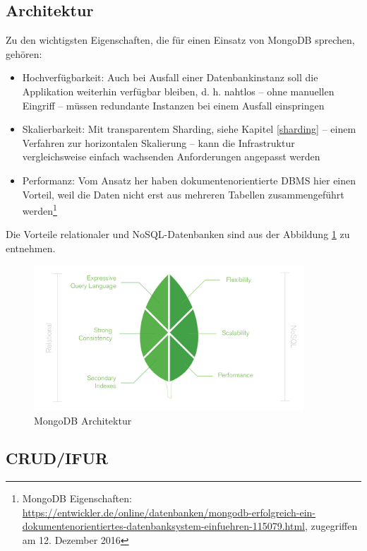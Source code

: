 \subsection{Architektur}
Zu den wichtigsten Eigenschaften, die für einen Einsatz von MongoDB sprechen, gehören:
\begin{itemize}
\item Hochverfügbarkeit: Auch bei Ausfall einer Datenbankinstanz soll die Applikation weiterhin verfügbar bleiben, d. h. nahtlos – ohne manuellen Eingriff – müssen redundante Instanzen bei einem Ausfall einspringen
\item Skalierbarkeit: Mit transparentem Sharding, siehe Kapitel \ref{sharding} – einem Verfahren zur horizontalen Skalierung – kann die Infrastruktur vergleichsweise einfach wachsenden Anforderungen angepasst werden
\item Performanz: Vom Ansatz her haben dokumentenorientierte DBMS hier einen Vorteil, weil die Daten nicht erst aus mehreren Tabellen zusammengeführt werden\footnote{MongoDB Eigenschaften: \url{https://entwickler.de/online/datenbanken/mongodb-erfolgreich-ein-dokumentenorientiertes-datenbanksystem-einfuehren-115079.html}, zugegriffen am 12. Dezember 2016}
\end{itemize}

Die Vorteile relationaler und NoSQL-Datenbanken sind aus der Abbildung \ref{img:architektur} zu entnehmen.
\begin{figure}
\centering
\includegraphics[width=0.9\textwidth]{resources/architectureNoSQLVSRelational}
\caption[MongoDB Architektur]{MongoDB Architektur\protect\footnotemark}
\label{img:architektur}
\end{figure}

\subsection{CRUD/IFUR}
